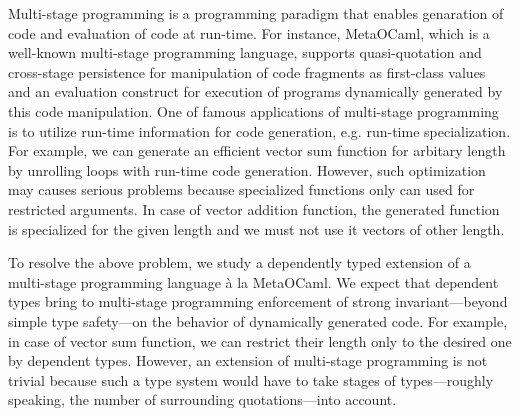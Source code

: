 \documentclass[master,english]{kuisthesis}
\begin{document}
\date{Feburary 15, 2020}			%

\maketitle

\begin{eabstract}


    Multi-stage programming is a programming paradigm that enables genaration of
    code and evaluation of code at run-time. For instance, MetaOCaml, which is
    a well-known multi-stage programming language, supports quasi-quotation and
    cross-stage persistence for manipulation of code fragments as first-class
    values and an evaluation construct for execution of programs dynamically
    generated by this code manipulation. One of famous applications of
    multi-stage programming is to utilize run-time information for code
    generation, e.g. run-time specialization. For example, we can generate an
    efficient vector sum function for arbitary length by unrolling loops with
    run-time code generation. However, such optimization may causes serious
    problems because specialized functions only can used for restricted
    arguments. In case of vector addition function, the generated function is
    specialized for the given length and we must not use it vectors of other
    length.


To resolve the above problem, we study a dependently typed extension of a
    multi-stage programming language \`a la MetaOCaml. We expect that dependent
    types bring to multi-stage programming enforcement of strong
    invariant---beyond simple type safety---on the behavior of dynamically
    generated code. For example, in case of vector sum function, we can
    restrict their length only to the desired one by dependent types. However,
    an extension of multi-stage programming is not trivial because such a type
    system would have to take stages of types---roughly speaking, the number of
    surrounding quotations---into account.


\end{eabstract}
\end{document}
